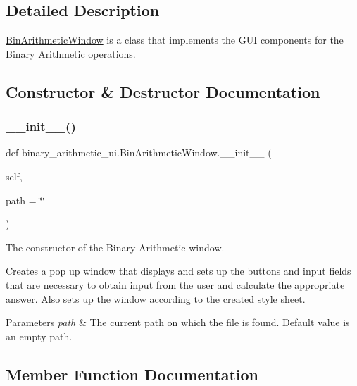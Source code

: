 \subsection{Detailed Description}
\hyperlink{classbinary__arithmetic__ui_1_1_bin_arithmetic_window}{Bin\+Arithmetic\+Window} is a class that implements the G\+UI components for the Binary Arithmetic operations. 

\subsection{Constructor \& Destructor Documentation}
\mbox{\label{classbinary__arithmetic__ui_1_1_bin_arithmetic_window_a0511ad3ac87d51b48420f7dc4c4dd35d}} 
\subsubsection{\texorpdfstring{\+\_\+\+\_\+init\+\_\+\+\_\+()}{\_\_init\_\_()}}
{\footnotesize\ttfamily def binary\+\_\+arithmetic\+\_\+ui.\+Bin\+Arithmetic\+Window.\+\_\+\+\_\+init\+\_\+\+\_\+ (\begin{DoxyParamCaption}\item[{}]{self,  }\item[{}]{path = {\ttfamily \char`\"{}\char`\"{}} }\end{DoxyParamCaption})}



The constructor of the Binary Arithmetic window. 

Creates a pop up window that displays and sets up the buttons and input fields that are necessary to obtain input from the user and calculate the appropriate answer. Also sets up the window according to the created style sheet. 
\begin{DoxyParams}{Parameters}
{\em path} & The current path on which the file is found. Default value is an empty path. \\
\hline
\end{DoxyParams}


\subsection{Member Function Documentation}
\mbox{\label{classbinary__arithmetic__ui_1_1_bin_arithmetic_window_ae3a5ab3baee92929acc1ee524456825a}} 
